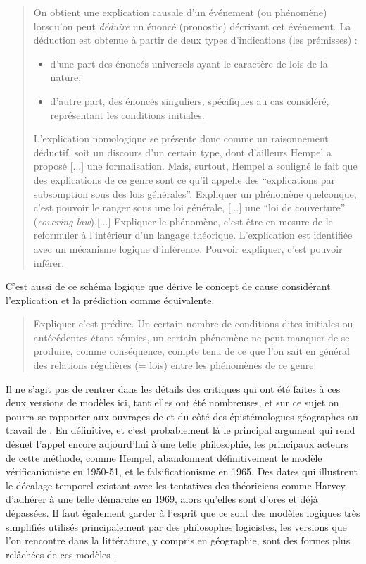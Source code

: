 \blockquote[{\cite[12]{Besse2000}}]{On obtient une explication causale d'un événement (ou phénomène) lorsqu'on peut \textit{déduire} un énoncé (pronostic) décrivant cet événement. La déduction est obtenue à partir de deux types d'indications (les prémisses) :
\begin{itemize}
\item d'une part des énoncés universels ayant le caractère de lois de la nature;
\item d'autre part, des énoncés singuliers, spécifiques au cas considéré, représentant les conditions initiales.
\end{itemize}
L'explication nomologique se présente donc comme un raisonnement déductif, soit un discours d'un certain type, dont d'ailleurs Hempel a proposé [...] une formalisation. Mais, surtout, Hempel a souligné le fait que des explications de ce genre sont ce qu'il appelle des \enquote{explications par subsomption sous des lois générales}. Expliquer un phénomène quelconque, c'est pouvoir le ranger sous une loi générale, [...] une \enquote{loi de couverture} (\textit{covering law}).[...] Expliquer le phénomène, c'est être en mesure de le reformuler à l'intérieur d'un langage théorique. L'explication est identifiée avec un mécanisme logique d'inférence. Pouvoir expliquer, c'est pouvoir inférer.}

C'est aussi de ce schéma logique que dérive le concept de cause considérant l'explication et la prédiction comme équivalente.

\blockquote[{\cite[12]{Besse2000}}]{Expliquer c'est prédire. Un certain nombre de conditions dites initiales ou antécédentes étant réunies, un certain phénomène ne peut manquer de se produire, comme conséquence, compte tenu de ce que l'on sait en général des relations régulières (= lois) entre les phénomènes de ce genre.}

Il ne s'agit pas de rentrer dans les détails des critiques qui ont été faites à ces deux versions de modèles ici, tant elles ont été nombreuses, et sur ce sujet on pourra se rapporter aux ouvrages de \textcites{Chalmers1987}[214-215]{Meyer1979} et du côté des épistémologues géographes au travail de \autocite{Besse2000}. En définitive, et c'est probablement là le principal argument qui rend désuet l'appel encore aujourd'hui à une telle philosophie, les principaux acteurs de cette méthode, comme Hempel, abandonnent définitivement le modèle vérificanioniste en 1950-51, et le falsificationisme en 1965. Des dates qui illustrent le décalage temporel existant avec les tentatives des théoriciens comme Harvey d'adhérer à une telle démarche en 1969, alors qu'elles sont d'ores et déjà dépassées. Il faut également garder à l'esprit que ce sont des modèles logiques très simplifiés utilisés principalement par des philosophes logicistes, les versions que l'on rencontre dans la littérature, y compris en géographie, sont des formes plus relâchées de ces modèles \autocite{Besse2000}.


